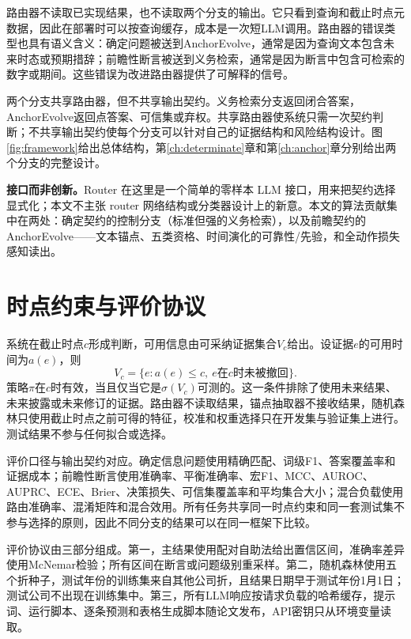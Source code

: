 路由器不读取已实现结果，也不读取两个分支的输出。它只看到查询和截止时点元数据，因此在部署时可以按查询缓存，成本是一次短LLM调用。路由器的错误类型也具有语义含义：确定问题被送到AnchorEvolve，通常是因为查询文本包含未来时态或预期措辞；前瞻性断言被送到义务检索，通常是因为断言中包含可检索的数字或期间。这些错误为改进路由器提供了可解释的信号。

两个分支共享路由器，但不共享输出契约。义务检索分支返回闭合答案，AnchorEvolve返回点答案、可信集或弃权。共享路由器使系统只需一次契约判断；不共享输出契约使每个分支可以针对自己的证据结构和风险结构设计。图\ref{fig:framework}给出总体结构，第\ref{ch:determinate}章和第\ref{ch:anchor}章分别给出两个分支的完整设计。

\begin{revbox}

\noindent\textbf{接口而非创新。}Router 在这里是一个简单的零样本 LLM 接口，用来把契约选择显式化；本文不主张 router 网络结构或分类器设计上的新意。本文的算法贡献集中在两处：确定契约的控制分支（标准但强的义务检索），以及前瞻契约的 AnchorEvolve——文本锚点、五类资格、时间演化的可靠性/先验，和全动作损失感知读出。
\end{revbox}



\section{时点约束与评价协议}

系统在截止时点$c$形成判断，可用信息由可采纳证据集合$V_c$给出。设证据$e$的可用时间为$a(e)$，则
\begin{equation}
V_c=\{e:a(e)\le c,\ e\text{在}c\text{时未被撤回}\}.
\end{equation}
策略$\pi$在$c$时有效，当且仅当它是$\sigma(V_c)$可测的。这一条件排除了使用未来结果、未来披露或未来修订的证据。路由器不读取结果，锚点抽取器不接收结果，随机森林只使用截止时点之前可得的特征，校准和权重选择只在开发集与验证集上进行。测试结果不参与任何拟合或选择。

评价口径与输出契约对应。确定信息问题使用精确匹配、词级F1、答案覆盖率和证据成本；前瞻性断言使用准确率、平衡准确率、宏F1、MCC、AUROC、AUPRC、ECE、Brier、决策损失、可信集覆盖率和平均集合大小；混合负载使用路由准确率、混淆矩阵和混合效用。所有任务共享同一时点约束和同一套测试集不参与选择的原则，因此不同分支的结果可以在同一框架下比较。

评价协议由三部分组成。第一，主结果使用配对自助法给出置信区间，准确率差异使用McNemar检验；所有区间在断言或问题级别重采样。第二，随机森林使用五个折种子，测试年份的训练集来自其他公司折，且结果日期早于测试年份1月1日；测试公司不出现在训练集中。第三，所有LLM响应按请求负载的哈希缓存，提示词、运行脚本、逐条预测和表格生成脚本随论文发布，API密钥只从环境变量读取。

